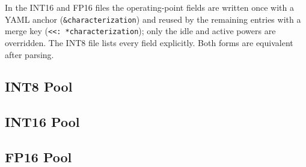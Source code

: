 In the INT16 and FP16 files the operating-point fields are written
once with a YAML anchor (\texttt{\&characterization}) and reused by
the remaining entries with a merge key (\texttt{<{}<: *characterization}); only the idle and active powers are overridden.
The INT8 file lists every field explicitly. Both forms are equivalent
after parsing.

\clearpage
\subsection{INT8 Pool}
\label{app:ip_pool_int8}



\clearpage
\subsection{INT16 Pool}
\label{app:ip_pool_int16}



\clearpage
\subsection{FP16 Pool}
\label{app:ip_pool_fp16}


